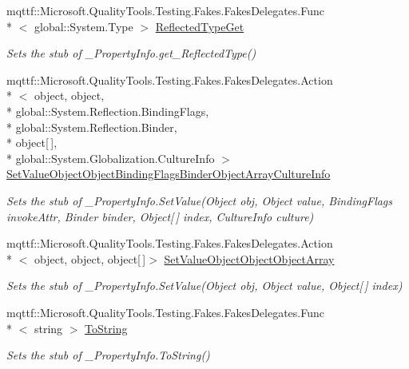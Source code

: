 \begin{DoxyCompactItemize}
mqttf\-::\-Microsoft.\-Quality\-Tools.\-Testing.\-Fakes.\-Fakes\-Delegates.\-Func\\*
$<$ global\-::\-System.\-Type $>$ \hyperlink{class_system_1_1_runtime_1_1_interop_services_1_1_fakes_1_1_stub___property_info_a2f4a212b28b724e27dd6c6e5a98978f7}{Reflected\-Type\-Get}
\begin{DoxyCompactList}\small\item\em Sets the stub of \-\_\-\-Property\-Info.\-get\-\_\-\-Reflected\-Type()\end{DoxyCompactList}\item 
mqttf\-::\-Microsoft.\-Quality\-Tools.\-Testing.\-Fakes.\-Fakes\-Delegates.\-Action\\*
$<$ object, object, \\*
global\-::\-System.\-Reflection.\-Binding\-Flags, \\*
global\-::\-System.\-Reflection.\-Binder, \\*
object\mbox{[}$\,$\mbox{]}, \\*
global\-::\-System.\-Globalization.\-Culture\-Info $>$ \hyperlink{class_system_1_1_runtime_1_1_interop_services_1_1_fakes_1_1_stub___property_info_a7695ee33506a7ca794999ef8f3371ae4}{Set\-Value\-Object\-Object\-Binding\-Flags\-Binder\-Object\-Array\-Culture\-Info}
\begin{DoxyCompactList}\small\item\em Sets the stub of \-\_\-\-Property\-Info.\-Set\-Value(\-Object obj, Object value, Binding\-Flags invoke\-Attr, Binder binder, Object\mbox{[}$\,$\mbox{]} index, Culture\-Info culture)\end{DoxyCompactList}\item 
mqttf\-::\-Microsoft.\-Quality\-Tools.\-Testing.\-Fakes.\-Fakes\-Delegates.\-Action\\*
$<$ object, object, object\mbox{[}$\,$\mbox{]}$>$ \hyperlink{class_system_1_1_runtime_1_1_interop_services_1_1_fakes_1_1_stub___property_info_a48542b4cffab0adf6822515caf1460ff}{Set\-Value\-Object\-Object\-Object\-Array}
\begin{DoxyCompactList}\small\item\em Sets the stub of \-\_\-\-Property\-Info.\-Set\-Value(\-Object obj, Object value, Object\mbox{[}$\,$\mbox{]} index)\end{DoxyCompactList}\item 
mqttf\-::\-Microsoft.\-Quality\-Tools.\-Testing.\-Fakes.\-Fakes\-Delegates.\-Func\\*
$<$ string $>$ \hyperlink{class_system_1_1_runtime_1_1_interop_services_1_1_fakes_1_1_stub___property_info_a150b90b4bbbb0acb9f5c67f21a929142}{To\-String}
\begin{DoxyCompactList}\small\item\em Sets the stub of \-\_\-\-Property\-Info.\-To\-String()\end{DoxyCompactList}\end{DoxyCompactItemize}


